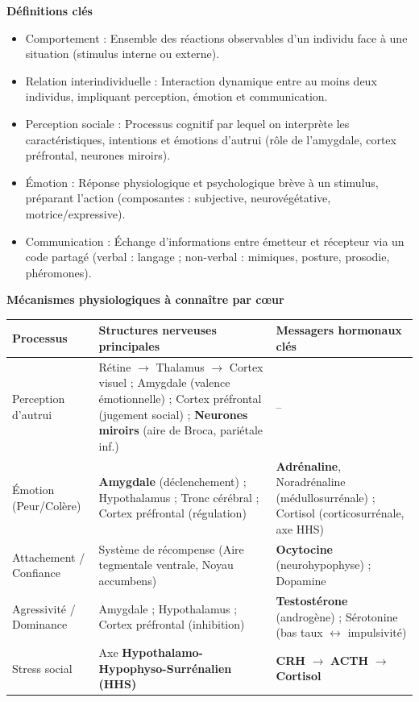 \documentclass[11pt]{article}
\newcommand{\cle}[1]{{\popxbold\color{popdark}#1}}
\begin{document}
\begin{bilan}

\textbf{Définitions clés}
\begin{itemize}
  \item \cle{Comportement} : Ensemble des réactions observables d'un individu face à une situation (stimulus interne ou externe).
  \item \cle{Relation interindividuelle} : Interaction dynamique entre au moins deux individus, impliquant perception, émotion et communication.
  \item \cle{Perception sociale} : Processus cognitif par lequel on interprète les caractéristiques, intentions et émotions d'autrui (rôle de l'amygdale, cortex préfrontal, neurones miroirs).
  \item \cle{Émotion} : Réponse physiologique et psychologique brève à un stimulus, préparant l'action (composantes : subjective, neurovégétative, motrice/expressive).
  \item \cle{Communication} : Échange d'informations entre émetteur et récepteur via un code partagé (verbal : langage ; non-verbal : mimiques, posture, prosodie, phéromones).
\end{itemize}

\textbf{Mécanismes physiologiques à connaître par cœur}
\begin{center}
\begin{tabularx}{\linewidth}{|l|X|X|}\hline
\rowcolor{popblueL}
\textbf{Processus} & \textbf{Structures nerveuses principales} & \textbf{Messagers hormonaux clés} \\ \hline
Perception d'autrui & Rétine $\to$ Thalamus $\to$ Cortex visuel ; Amygdale (valence émotionnelle) ; Cortex préfrontal (jugement social) ; \textbf{Neurones miroirs} (aire de Broca, pariétale inf.) & -- \\ \hline
Émotion (Peur/Colère) & \textbf{Amygdale} (déclenchement) ; Hypothalamus ; Tronc cérébral ; Cortex préfrontal (régulation) & \textbf{Adrénaline}, Noradrénaline (médullosurrénale) ; Cortisol (corticosurrénale, axe HHS) \\ \hline
Attachement / Confiance & Système de récompense (Aire tegmentale ventrale, Noyau accumbens) & \textbf{Ocytocine} (neurohypophyse) ; Dopamine \\ \hline
Agressivité / Dominance & Amygdale ; Hypothalamus ; Cortex préfrontal (inhibition) & \textbf{Testostérone} (androgène) ; Sérotonine (bas taux $\leftrightarrow$ impulsivité) \\ \hline
Stress social & Axe \textbf{Hypothalamo-Hypophyso-Surrénalien (HHS)} & \textbf{CRH} $\to$ \textbf{ACTH} $\to$ \textbf{Cortisol} \\ \hline
\end{tabularx}
\end{center}


\end{bilan}
\end{document}
